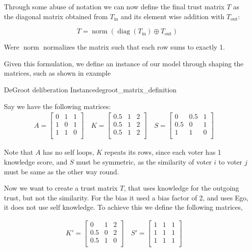 Through some abuse of notation we can now define the final trust matrix $T$ as the diagonal matrix obtained from $T_{\text{in}}$ and its element wise addition with $T_{\text{out}}$:

\begin{equation}
	T = \operatorname{norm}\left(\operatorname{diag}(T_{\text{in}}) \oplus T_{\text{out}}\right)
	\label{eq:final_trust}
\end{equation}

Were $\operatorname{norm}$ normalizes the matrix such that each row sums to exactly 1.


Given this formulation, we define an instance of our model through shaping the matrices, such as shown in example

\begin{example}{DeGroot deliberation Instance}{degroot_matrix_definition}

	Say we have the following matrices:
	\begin{align}
		A = \begin{bmatrix}
			    0 & 1 & 1 \\
			    1 & 0 & 1 \\
			    1 & 1 & 0 \\
		    \end{bmatrix} \quad
		K = \begin{bmatrix}
			    0.5 & 1 & 2 \\
			    0.5 & 1 & 2 \\
			    0.5 & 1 & 2 \\
		    \end{bmatrix}\quad
		S = \begin{bmatrix}
			    0   & 0.5 & 1 \\
			    0.5 & 0   & 1 \\
			    1   & 1   & 0 \\
		    \end{bmatrix}\quad
	\end{align}

	Note that $A$ has no self loops, $K$ repeats its rows, since each voter has 1
	knowledge score, and $S$ must be symmetric, as the similarity of voter $i$
	to voter $j$ must be same as the other way round.

	Now we want to create a trust matrix $T$, that uses knowledge for the outgoing trust, but not the similarity. For the bias it used a bias factor of 2, and uses Ego, it does not use self knowledge. To achieve this we define the following matrices,

	\begin{align}
		K' = \begin{bmatrix}
			     0   & 1 & 2 \\
			     0.5 & 0 & 2 \\
			     0.5 & 1 & 0 \\
		     \end{bmatrix}\quad
		S' = \begin{bmatrix}
			     1 & 1 & 1 \\
			     1 & 1 & 1 \\
			     1 & 1 & 1 \\
		     \end{bmatrix}\quad
	\end{align}


\end{example}
